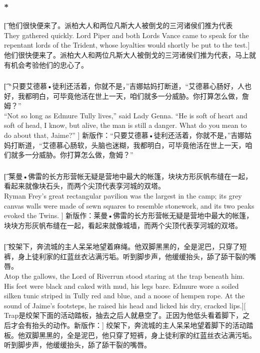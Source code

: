 \documentclass[12pt,a4paper]{article}
\begin{document}
\subsubsection{\color{red}*}\t[
	他们很快便来了。派柏大人和两位凡斯大人被倒戈的三河诸侯们推为代表\\
	They gathered quickly. Lord Piper and both Lords Vance came to speak for the repentant lords of the Trident, whose loyalties would shortly be put to the test.]
	他们很快便来了。派柏大人和两位凡斯大人被倒戈的三河诸侯们推为代表，马上就有机会考验他们的忠心了。
	
\subsubsection{}\t[
	 “只要艾德慕•徒利还活着，你就不是，”吉娜姑妈打断道，“艾德慕心肠好，人也好，我都明白，可毕竟他活在世上一天，咱们就多一分威胁。你打算怎么做，詹姆？”\\
	 “Not so long as Edmure Tully lives,” said Lady Genna. “He is soft of heart and soft of head, I know, but alive, the man is still a danger. What do you mean to do about that, Jaime?” ]
	 新版作：“只要艾德慕•徒利还活着，你就不是，”吉娜姑妈打断道，“艾德慕心肠软，头脑也迷糊，我都明白，可毕竟他活在世上一天，咱们就多一分威胁。你打算怎么做，詹姆？”
	 
\subsubsection{}\t[
	莱曼•佛雷的长方形营帐无疑是营地中最大的帐篷，块块方形灰帆布缝在一起，看起来就像块石头，而两个尖顶代表孪河城的双塔。\\
	Ryman Frey's great rectangular pavilion was the largest in the camp; its grey canvas walls were made of sewn squares to resemble stonework, and its two peaks evoked the Twins. ]
	新版作：莱曼•佛雷的长方形营帐无疑是营地中最大的帐篷，块块方形灰帆布缝在一起，看起来就像城墙，而两个尖顶代表孪河城的双塔。
	
\subsubsection{}\t[
	绞架下，奔流城的主人呆呆地望着麻绳。他双脚黑黑的，全是泥巴，只穿了短裤，身上徒利家的红蓝丝衣沾满污垢。听到脚步声，他缓缓抬头，舔了舔干裂的嘴唇。\\
	Atop the gallows, the Lord of Riverrun stood staring at the trap beneath him. His feet were black and caked with mud, his legs bare. Edmure wore a soiled silken tunic striped in Tully red and blue, and a noose of hempen rope. At the sound of Jaime's footsteps, he raised his head and licked his dry, cracked lips.][
	Trap是绞架下面的活动踏板，抽去之后人就悬空了。正因为他低头看着脚下，之后才会有抬头的动作。新版作：]
	绞架下，奔流城的主人呆呆地望着脚下的活动踏板。他双脚黑黑的，全是泥巴，他只穿了短裤，身上徒利家的红蓝丝衣沾满污垢。听到脚步声，他缓缓抬头，舔了舔干裂的嘴唇。
	
\end{document}
